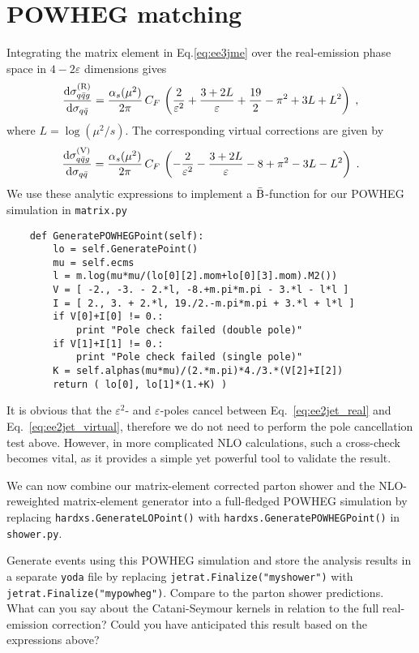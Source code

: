 \documentclass[10pt,fleqn]{scrartcl}
\begin{document}
\section{POWHEG matching}
\label{sec:powheg}
Integrating the matrix element in Eq.\eqref{eq:ee3jme} over the real-emission
phase space in $4-2\varepsilon$ dimensions gives
\begin{equation}\label{eq:ee2jet_real}
  \frac{{\rm d}\sigma_{q\bar{q}g}^{\rm(R)}}{{\rm d}\sigma_{q\bar{q}}}=
    \frac{\alpha_s(\mu^2)}{2\pi}\,C_F\,\left(
    \frac{2}{\varepsilon^2}+\frac{3+2L}{\varepsilon}
    +\frac{19}{2}-\pi^2+3L+L^2\right)\;,
\end{equation}
where $L=\log(\mu^2/s)$. The corresponding virtual corrections are given by
\begin{equation}\label{eq:ee2jet_virtual}
  \frac{{\rm d}\sigma_{q\bar{q}g}^{\rm(V)}}{{\rm d}\sigma_{q\bar{q}}}=
    \frac{\alpha_s(\mu^2)}{2\pi}\,C_F\,\left(
    -\frac{2}{\varepsilon^2}-\frac{3+2L}{\varepsilon}
    -8+\pi^2-3L-L^2\right)\;.
\end{equation}
We use these analytic expressions to implement a $\bar{\rm B}$-function 
for our POWHEG simulation in {\tt matrix.py}
\begin{verbatim}
    def GeneratePOWHEGPoint(self):
        lo = self.GeneratePoint()
        mu = self.ecms
        l = m.log(mu*mu/(lo[0][2].mom+lo[0][3].mom).M2())
        V = [ -2., -3. - 2.*l, -8.+m.pi*m.pi - 3.*l - l*l ]
        I = [ 2., 3. + 2.*l, 19./2.-m.pi*m.pi + 3.*l + l*l ]
        if V[0]+I[0] != 0.:
            print "Pole check failed (double pole)"
        if V[1]+I[1] != 0.:
            print "Pole check failed (single pole)"
        K = self.alphas(mu*mu)/(2.*m.pi)*4./3.*(V[2]+I[2])
        return ( lo[0], lo[1]*(1.+K) )
\end{verbatim}
It is obvious that the $\varepsilon^2$- and $\varepsilon$-poles cancel between
Eq.~\eqref{eq:ee2jet_real} and Eq.~\eqref{eq:ee2jet_virtual}, therefore we do not
need to perform the pole cancellation test above. However, in more complicated
NLO calculations, such a cross-check becomes vital, as it provides a simple 
yet powerful tool to validate the result.

We can now combine our matrix-element corrected parton shower and the
NLO-reweighted matrix-element generator into a full-fledged 
POWHEG simulation by replacing \verb!hardxs.GenerateLOPoint()! with 
\verb!hardxs.GeneratePOWHEGPoint()! in {\tt shower.py}.

Generate events using this POWHEG simulation and store the analysis results
in a separate {\tt yoda} file by replacing \verb!jetrat.Finalize("myshower")!
with \verb!jetrat.Finalize("mypowheg")!. Compare to the parton shower predictions.
What can you say about the Catani-Seymour kernels in relation to the full 
real-emission correction? Could you have anticipated this result based on
the expressions above?
\end{document}
